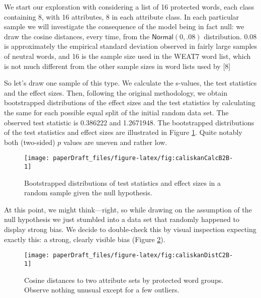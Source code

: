 \documentclass[
  12pt,
  dvipsnames,enabledeprecatedfontcommands]{scrartcl}
\begin{document}
We start our exploration with considering a list of 16 protected words,
each class containing 8, with 16 attributes, 8 in each attribute class.
In each particular sample we will investigate the consequence of the
model being in fact null: we draw the cosine distances, every time, from
the \(\mathsf{Normal}(0,.08)\) distribution. \(0.08\) is approximately
the empirical standard deviation observed in fairly large samples of
neutral words, and 16 is the sample size used in the WEAT7 word list,
which is not much different from the other sample sizes in word lists
used by {[}8{]}

So let's draw one sample of this type. We calculate the s-values, the
test statistics and the effect sizes. Then, following the original
methodology, we obtain bootstrapped distributions of the effect sizes
and the test statistics by calculating the same for each possible equal
split of the initial random data set. The observed test statistic is
0.386222 and 1.2671948. The bootstrapped distributions of the test
statistics and effect sizes are illustrated in Figure
\ref{fig:caliskanCalc}. Quite notably both (two-sided) \(p\) values are
uneven and rather low.

\begin{figure}[H]

\begin{center}\texttt{[image: paperDraft\_files/figure-latex/fig:caliskanCalcB2B-1]} \end{center}

\caption{Bootstrapped distributions of test statistics and effect sizes in a random sample given the null hypothesis.}
\label{fig:caliskanCalc}
\end{figure}

At this point, we might think---right, so while drawing on the
assumption of the null hypothesis we just stumbled into a data set that
randomly happened to display strong bias. We decide to double-check this
by visual inspection expecting exactly this: a strong, clearly visible
bias (Figure \ref{fig:caliskanDistances}).

\begin{figure}[H]

\begin{center}\texttt{[image: paperDraft\_files/figure-latex/fig:caliskanDistC2B-1]} \end{center}

\caption{Cosine distances to two attribute sets by protected word groups. Observe nothing unusual except for a few outliers.}
\label{fig:caliskanDistances}
\end{figure}
\end{document}
